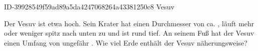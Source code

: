\begin{exercise}
      {ID-39928549f59ad89a5da4247068264a43381250c8}
      {Vesuv}
  \ifproblem\problem\par
    Der Vesuv ist etwa  hoch. Sein Krater hat einen Durchmesser
    von ca. , läuft mehr oder weniger spitz nach unten zu und
    ist rund  tief. An seinem Fuß hat der Vesuv einen Umfang
    von ungefähr . Wie viel Erde enthält der Vesuv näherungsweise?
  \fi
\end{exercise}

